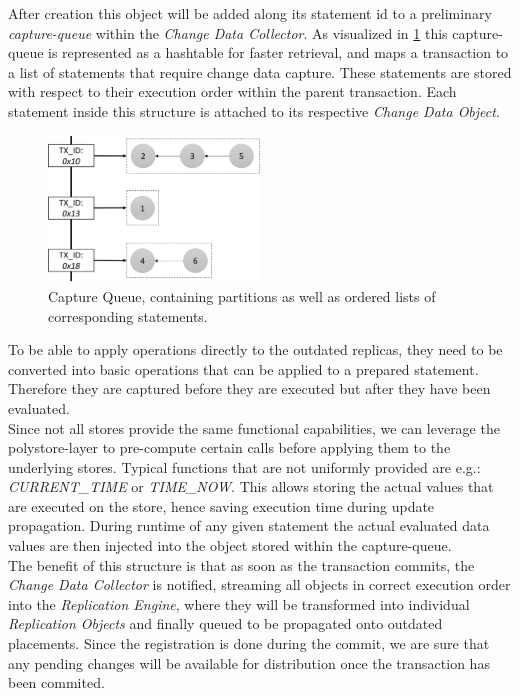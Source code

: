 After creation this object will be added along its statement id to a preliminary \emph{capture-queue} within the \emph{Change Data Collector}. 
As visualized in \ref{fig:hashtable} this capture-queue is represented as a hashtable for 
faster retrieval, and maps a transaction to a list of statements that require change data capture. 
These statements are stored with respect to their execution order within the parent transaction.
Each statement inside this structure is attached to its respective \emph{Change Data Object}.\\

\begin{figure}[t]
    \centering
    \includegraphics[width=0.5\textwidth]{Figures/hashtable.png}
    \caption{Capture Queue, containing partitions as well as ordered lists of corresponding statements.}
    \label{fig:hashtable}
\end{figure}

To be able to apply operations directly to the outdated replicas, they need to be converted into basic operations that can be applied to a prepared statement.
Therefore they are captured before they are executed but after they have been evaluated.\\
Since not all stores provide the same functional capabilities, we can leverage the polystore-layer to pre-compute certain calls before applying them to the underlying stores.
Typical functions that are not uniformly provided are e.g.: \emph{CURRENT\_TIME} or \emph{TIME\_NOW}. This allows storing the actual values that are executed on the store,
hence saving execution time during update propagation.
During runtime of any given statement the actual evaluated data values are then injected into the object stored within the capture-queue.\\
The benefit of this structure is that as soon as the transaction commits, the \emph{Change Data Collector} is notified, streaming all objects in correct execution order
into the \emph{Replication Engine}, where they will be transformed into individual \emph{Replication Objects} and finally queued to be propagated onto outdated placements. 
Since the registration is done during the commit, we are sure that any pending changes will be available for distribution once the transaction has been commited.



